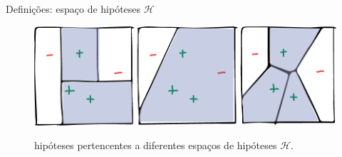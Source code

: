 \documentclass[10pt, professionalfonts]{beamer}
\begin{document}
{%

\begin{frame}{Definições: espaço de hipóteses  $\mathcal{H}$}
  \begin{figure}[!htp]
    \centering
    \includegraphics[width=.95\textwidth]{hspaces}
    \label{hspaces}
    \caption{hipóteses pertencentes a diferentes espaços de hipóteses $\mathcal{H}$.}
\end{figure}

\end{frame}

}
\end{document}
